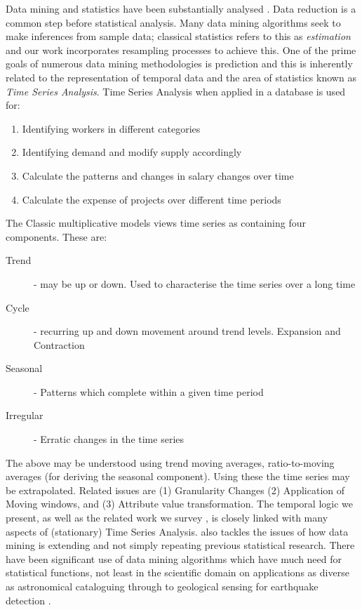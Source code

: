 Data mining and statistics have been substantially analysed
\cite{fhs96,gmp97}. Data reduction is a common step before statistical
analysis. Many data mining algorithms seek to make inferences from
sample data; classical statistics refers to this as {\em estimation}
and our work incorporates resampling processes \cite{efro79,et86,et93}
to achieve this. One of the prime goals of numerous data mining
methodologies is prediction and this is inherently related to the
representation of temporal data and the area of statistics known as
{\em Time Series Analysis}. Time Series Analysis when applied in a
 database is used for:

\begin{enumerate}
\item Identifying workers in different categories 
\item Identifying demand and modify supply accordingly
\item Calculate the patterns and changes in salary changes over time
\item Calculate the expense of projects over different time periods
\end{enumerate}

The Classic multiplicative models views time series as containing four components. These
are:

\begin{description}
\item[Trend] - may be up or down. Used to characterise the time series over a long time
\item[Cycle] - recurring up and down movement around trend levels. Expansion and Contraction
\item[Seasonal] - Patterns which complete within a given time period
\item[Irregular] - Erratic changes in the time series
\end{description}

The above may be understood using trend moving averages, ratio-to-moving averages (for deriving
the seasonal component). Using these the time series may be extrapolated.
Related issues are (1) Granularity Changes (2) Application of Moving
windows, and (3) Attribute value transformation. The temporal logic we
present, as well as the related work we survey
\cite{frm94,lai93,alss95,dgm97,dlm98}, is closely linked with many
aspects of (stationary) Time Series Analysis. \cite{gmp97} also
tackles the issues of how data mining is extending and not simply
repeating previous statistical research. There have been significant
use of data mining algorithms which have much need for statistical
functions, not least in the scientific domain on applications as
diverse as astronomical cataloguing through to geological sensing for
earthquake detection \cite{fhs96}.

